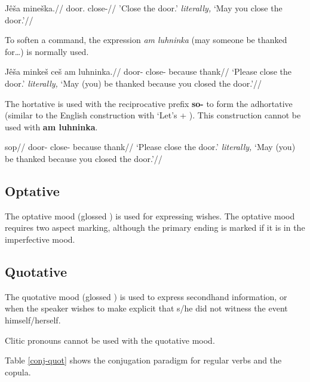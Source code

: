 	\pex
\begingl
\gla Jê\v{s}a mine\v{s}ka.//
\glb door. close-//
\glft 'Close the door.' \textit{literally,} `May you close the door.'//
\endgl
\xe

\par To soften a command, the expression \textit{am luhninka} (may someone be thanked for\ldots) is normally used.

\pex
\begingl
\gla Jê\v{s}a minke\v{s} ce\v{s} am luhninka.//
\glb door- close-  because thank//
\glft  `Please close the door.' \textit{literally,} `May (you) be thanked because you closed the door.'//
\endgl
\xe

\par The hortative is used with the reciprocative prefix \textbf{so-} to form the adhortative (similar to the English construction with `Let's + ). This construction cannot be used with \textbf{am luhninka}.

\pex
\begingl
\gla sop//
\glb door- close-  because thank//
\glft  `Please close the door.' \textit{literally,} `May (you) be thanked because you closed the door.'//
\endgl
\xe

\subsection{Optative}
The optative mood (glossed ) is used for expressing wishes. The optative mood requires two aspect marking, although the primary ending is marked if it is in the imperfective mood.



\subsection{Quotative }	
\par The quotative mood (glossed ) is used to express secondhand information, or when the speaker wishes to make explicit that s/he did not witness the event himself/herself.
\par Clitic pronouns cannot be used with the quotative mood.
\par Table \ref{conj-quot} shows the conjugation paradigm for regular verbs and the copula.


